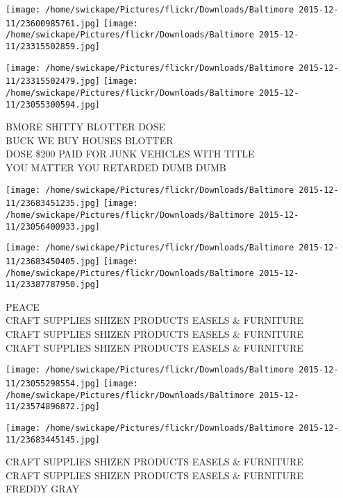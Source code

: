 \documentclass[10pt,letterpaper]{article}
\begin{document}
\texttt{[image: /home/swickape/Pictures/flickr/Downloads/Baltimore 2015-12-11/23600985761.jpg]}
\texttt{[image: /home/swickape/Pictures/flickr/Downloads/Baltimore 2015-12-11/23315502859.jpg]}

\texttt{[image: /home/swickape/Pictures/flickr/Downloads/Baltimore 2015-12-11/23315502479.jpg]}
\texttt{[image: /home/swickape/Pictures/flickr/Downloads/Baltimore 2015-12-11/23055300594.jpg]}

BMORE SHITTY BLOTTER DOSE\\
BUCK WE BUY HOUSES BLOTTER\\
DOSE \$200 PAID FOR JUNK VEHICLES WITH TITLE\\
YOU MATTER YOU RETARDED DUMB DUMB
\pagebreak

\texttt{[image: /home/swickape/Pictures/flickr/Downloads/Baltimore 2015-12-11/23683451235.jpg]}
\texttt{[image: /home/swickape/Pictures/flickr/Downloads/Baltimore 2015-12-11/23056400933.jpg]}

\texttt{[image: /home/swickape/Pictures/flickr/Downloads/Baltimore 2015-12-11/23683450405.jpg]}
\texttt{[image: /home/swickape/Pictures/flickr/Downloads/Baltimore 2015-12-11/23387787950.jpg]}

PEACE\\
CRAFT SUPPLIES SHIZEN PRODUCTS EASELS \& FURNITURE\\
CRAFT SUPPLIES SHIZEN PRODUCTS EASELS \& FURNITURE\\
CRAFT SUPPLIES SHIZEN PRODUCTS EASELS \& FURNITURE
\pagebreak

\texttt{[image: /home/swickape/Pictures/flickr/Downloads/Baltimore 2015-12-11/23055298554.jpg]}
\texttt{[image: /home/swickape/Pictures/flickr/Downloads/Baltimore 2015-12-11/23574896872.jpg]}

\vspace{0.25in}
\texttt{[image: /home/swickape/Pictures/flickr/Downloads/Baltimore 2015-12-11/23683445145.jpg]}

CRAFT SUPPLIES SHIZEN PRODUCTS EASELS \& FURNITURE\\
CRAFT SUPPLIES SHIZEN PRODUCTS EASELS \& FURNITURE\\
FREDDY GRAY
\pagebreak
\end{document}
